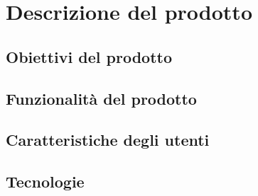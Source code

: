\section{Descrizione del prodotto}
\subsection{Obiettivi del prodotto}
\subsection{Funzionalità del prodotto}
\subsection{Caratteristiche degli utenti}
\subsection{Tecnologie}
